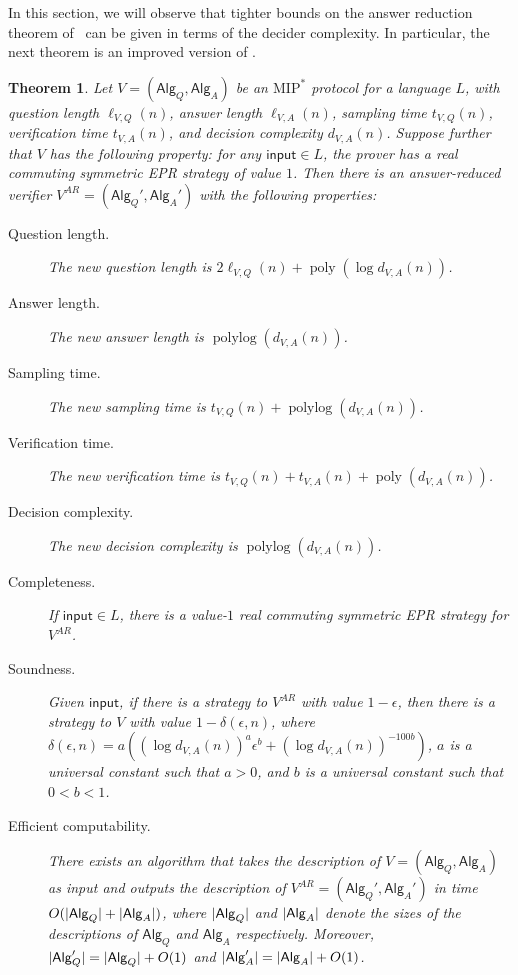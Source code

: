 \documentclass[11pt]{article}
\theoremstyle{plain}
\newtheorem{theorem}{Theorem}[section]
\theoremstyle{definition}
\DeclarePairedDelimiter{\abs}{\lvert}{\rvert}
\newcommand{\poly} {\ensuremath{\operatorname{poly}}}
\newcommand{\polylog} {\ensuremath{\operatorname{polylog}}}
\newcommand{\1}{\mathbb{1}} %
\newcommand{\ipt}{\mathsf{input}}
\newcommand{\Alg}{\mathsf{Alg}}
\newcommand{\MIP}{\mathrm{MIP}}
\begin{document}
In this section, we will observe that tighter bounds on the answer reduction theorem of~\cite{JNVWY'20,10.1145/3564246.3585208} can be given in terms of the decider complexity.
In particular, the next theorem is an improved version of \cite[Theorem 51]{10.1145/3564246.3585208}.
\begin{theorem}
    Let $V = (\Alg_Q, \Alg_A)$ be an $\MIP^*$ protocol for a language $L$, with question length $\ell_{V,Q}(n)$, 
    answer length $\ell_{V,A}(n)$,
    sampling time $t_{V,Q}(n)$, verification time $t_{V,A}(n)$, and decision complexity $d_{V,A}(n)$. 
    Suppose further that $V$ has the following property: for any $\ipt \in L$, the prover has a 
	real commuting symmetric EPR strategy of value $1$.
    Then there is an answer-reduced verifier $V^{AR} = (\Alg_Q', \Alg_A')$ with the following properties:
    \begin{description}
        \item[Question length.] The new question length is $2\ell_{V,Q}(n) + \poly(\log d_{V,A}(n))$.
        \item[Answer length.] The new answer length is $\polylog( d_{V,A}(n))$.
        \item[Sampling time.] The new sampling time is $t_{V,Q}(n) +\polylog (d_{V,A}(n))$.
        \item[Verification time.] The new verification time is $t_{V,Q}(n) + t_{V,A}(n)+ \poly(d_{V,A}(n))$. 
        \item[Decision complexity.] The new decision complexity is $\polylog(d_{V,A}(n))$.
        \item[Completeness.] If $\ipt \in L$, there is a value-$1$ real commuting symmetric EPR strategy for $V^{AR}$.
        \item[Soundness.] Given $\ipt$, if there is a strategy to $V^{AR}$ with value $1 -\epsilon$, then there is a strategy to $V$ with value $1 - 
    \delta(
    \epsilon, n)$, where $\delta(\epsilon, n) = a((\log d_{V,A}(n))^{a}\epsilon^b + (\log d_{V,A}(n))^{-100b})$, $a$ is a universal constant such that $a>0$, and $b$ is a universal constant such that $0 < b < 1$.
        \item[Efficient computability.] There exists an algorithm that takes the description of $V = (\Alg_Q, \Alg_A)$ as input and outputs the description of $V^{AR} = (\Alg_Q', \Alg_A')$ in time $O( \abs{\Alg_Q}+ \abs{\Alg_A})$,
        where $\abs{\Alg_Q}$ and $\abs{\Alg_A}$ denote the sizes of the descriptions of $\Alg_Q$ and $\Alg_A$ respectively.
        Moreover, $\abs{\Alg_Q'} = \abs{\Alg_Q} +O(1)$ and $\abs{\Alg_A'} = \abs{\Alg_A}+O(1)$.
    \end{description}
\end{theorem}
\end{document}
